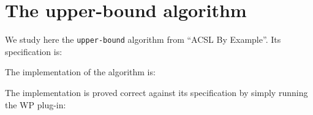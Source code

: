 \clearpage
\section{The \textsf{upper-bound} algorithm}

We study here the \texttt{upper-bound}
algorithm from ``ACSL By Example''. 
Its specification is:


The implementation of the algorithm is:


The implementation is proved correct against its specification by
simply running the \textsf{WP} plug-in:

